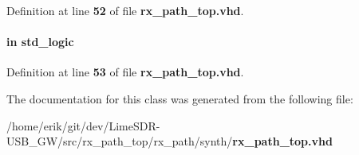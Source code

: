 Definition at line {\bf 52} of file {\bf rx\+\_\+path\+\_\+top.\+vhd}.

\paragraph[{tx\+\_\+pct\+\_\+loss\+\_\+clr}]{ {\bfseries \textcolor{keywordflow}{in}\textcolor{vhdlchar}{ }} {\bfseries \textcolor{comment}{std\+\_\+logic}\textcolor{vhdlchar}{ }} \hspace{0.3cm}{\ttfamily [Port]}}\label{classrx__path__top_a83b4174e47ecaf72e6a38d049a483891}


Definition at line {\bf 53} of file {\bf rx\+\_\+path\+\_\+top.\+vhd}.



The documentation for this class was generated from the following file\+:\begin{DoxyCompactItemize}
\item 
/home/erik/git/dev/\+Lime\+S\+D\+R-\/\+U\+S\+B\+\_\+\+G\+W/src/rx\+\_\+path\+\_\+top/rx\+\_\+path/synth/{\bf rx\+\_\+path\+\_\+top.\+vhd}\end{DoxyCompactItemize}
